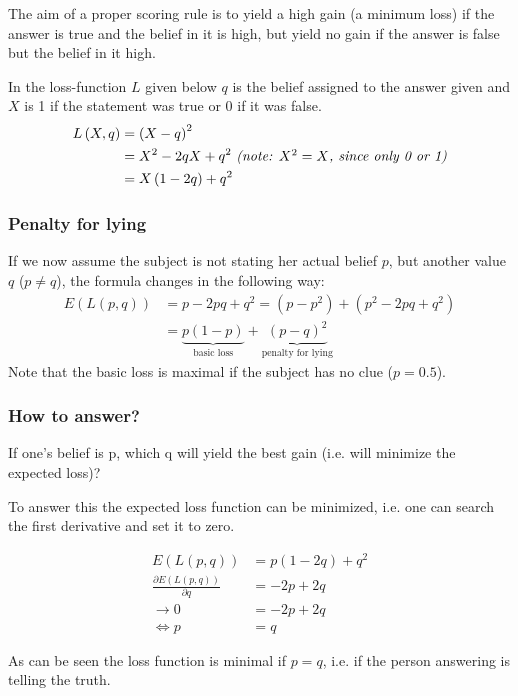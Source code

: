 \documentclass[../main/Notes.tex]{subfiles}
\begin{document}
\bigskip

The aim of a proper scoring rule is to yield a high gain (a minimum loss) if the answer is true and the belief in it is high, but yield no gain if the answer is false but the belief in it high.

In the loss-function $L$ given below $q$ is the belief assigned to the answer given and $X$ is 1 if the statement was true or 0 if it was false.
\begin{align*}
L\left(X,q\right) &= \left(X-q\right)^2 \\
                  &= X^2-2qX+q^2 \mbox{ \textit{(note: $X^2 = X$, since only 0 or 1)}} \\
                  &= X\left(1-2q\right)+q^2
\end{align*}

\subsubsection*{Penalty for lying}
If we now assume the subject is not stating her actual belief $p$, but another value $q$ ($p\neq q$), the formula changes in the following way:
\begin{align*}
E\left(L\left(p,q\right)\right) &= p-2pq+q^2 = \left(p-p^2\right) + \left(p^2-2pq+q^2\right) \\&= \underbrace{p\left(1-p\right)}_\text{basic loss} + \underbrace{\left(p-q\right)^2}_\text{penalty for lying}
\end{align*}
Note that the basic loss is maximal if the subject has no clue ($p=0.5$). 
\subsubsection*{How to answer?}
If one's belief is p, which q will yield the best gain (i.e. will minimize the expected loss)?

To answer this the expected loss function can be minimized, i.e. one can search the first derivative and set it to zero. 

\begin{align*}
E\left(L\left(p,q\right)\right) &= p\left(1-2q\right)+q^2 \\
\frac{\partial E\left(L\left(p,q\right)\right)}{\partial q} &= -2p + 2q \\
\rightarrow 0 &= -2p + 2q \\
\Leftrightarrow p &= q
\end{align*}

As can be seen the loss function is minimal if $p=q$, i.e. if the person answering is telling the truth.
\end{document}
